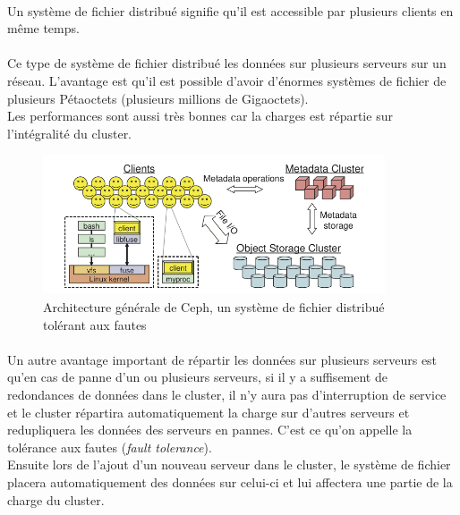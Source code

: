 \paragraph*{}
Un système de fichier distribué signifie qu'il est accessible par plusieurs clients en même temps.

\paragraph*{}
Ce type de système de fichier distribué les données sur plusieurs serveurs sur un réseau. L'avantage est qu'il est possible d'avoir d'énormes systèmes de fichier de plusieurs
Pétaoctets (plusieurs millions de Gigaoctets).\\
Les performances sont aussi très bonnes car la charges est répartie sur l'intégralité du cluster.

\begin{figure}[H]
\centering
\includegraphics[width=0.9\textwidth]{resource/img/ceph-architecture}
\caption{Architecture générale de Ceph, un système de fichier distribué tolérant aux fautes}
\label{archionescalein}
\end{figure}

\paragraph*{}
Un autre avantage important de répartir les données sur plusieurs serveurs est qu'en cas de panne d'un ou plusieurs serveurs, si il y a suffisement de redondances
de données dans le cluster, il n'y aura pas d'interruption de service et le cluster répartira automatiquement la charge sur d'autres serveurs et redupliquera les données
des serveurs en pannes. C'est ce qu'on appelle la tolérance aux fautes (\emph{fault tolerance}).\\
Ensuite lors de l'ajout d'un nouveau serveur dans le cluster, le système de fichier placera automatiquement des données sur celui-ci et lui affectera une
partie de la charge du cluster.

